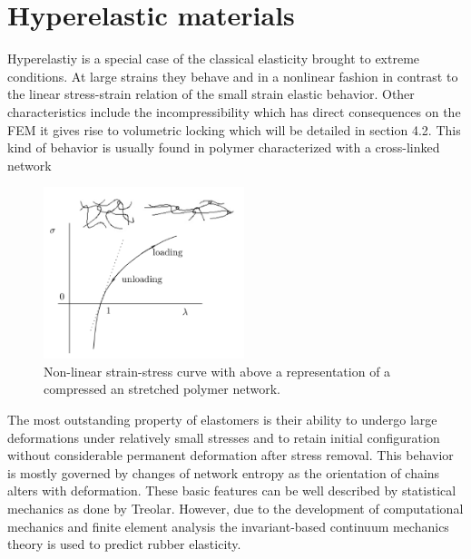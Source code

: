 \section{Hyperelastic materials}
Hyperelastiy is a special case of the classical elasticity brought to extreme conditions. At large strains they behave and in a nonlinear fashion in contrast to the linear stress-strain relation of the small strain elastic behavior. 
Other characteristics include the incompressibility which has direct consequences on the FEM it gives rise to volumetric locking which will be detailed in section 4.2. 
This kind of behavior is usually found in polymer characterized with a cross-linked network

\begin{figure}[h]
\centering
  \includegraphics[height=5cm]{img/strainstress.PNG}
   \caption{Non-linear strain-stress curve with above a representation of a compressed an stretched polymer network.}
 \label{fgr:graft}
\end{figure}

The most outstanding property of elastomers is their ability
to undergo large deformations under relatively small stresses and
to retain initial configuration without considerable permanent
deformation after stress removal. This behavior is mostly governed
by changes of network entropy as the orientation of chains alters
with deformation. These basic features can be well described by statistical mechanics as done by Treolar. However, due to the development of computational mechanics and finite element analysis the invariant-based continuum mechanics theory is used to predict rubber elasticity.
